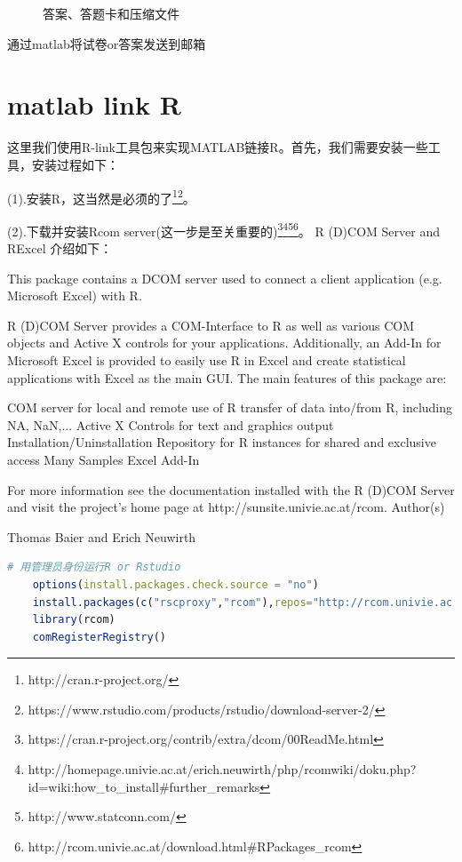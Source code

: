\begin{figure}
\begin{subfigure}[b]{0.5\textwidth}
                    \caption{}
                    \label{fig:压缩文件}
                \end{subfigure}
                 \caption{答案、答题卡和压缩文件}
            \end{figure}
            \par
            通过matlab将试卷or答案发送到邮箱
\section{matlab link R}
    \par
    这里我们使用R-link工具包来实现MATLAB链接R。首先，我们需要安装一些工具，安装过程如下：
    \par
    (1).安装R，这当然是必须的了\footnote{http://cran.r-project.org/}\footnote{https://www.rstudio.com/products/rstudio/download-server-2/}。
    \par
    (2).下载并安装Rcom server(这一步是至关重要的)\footnote{https://cran.r-project.org/contrib/extra/dcom/00ReadMe.html}\footnote{http://homepage.univie.ac.at/erich.neuwirth/php/rcomwiki/doku.php?id=wiki:how\_to\_install\#further\_remarks}\footnote{http://www.statconn.com/}\footnote{http://rcom.univie.ac.at/download.html\#RPackages\_rcom}。
    R (D)COM Server and RExcel 介绍如下：
    \par
    This package contains a DCOM server used to connect a client application (e.g. Microsoft Excel) with R.
    \par
    R (D)COM Server provides a COM-Interface to R as well as various COM objects and Active X controls for your applications. Additionally, an Add-In for Microsoft Excel is provided to easily use R in Excel and create statistical applications with Excel as the main GUI. The main features of this package are:
    \par
        COM server for local and remote use of R
        transfer of data into/from R, including NA, NaN,...
        Active X Controls for text and graphics output
        Installation/Uninstallation
        Repository for R instances for shared and exclusive access
        Many Samples
        Excel Add-In
    \par
    For more information see the documentation installed with the R (D)COM Server and visit the project's home page at http://sunsite.univie.ac.at/rcom.
    Author(s)
    \par
    Thomas Baier and Erich Neuwirth
    \begin{lstlisting}[language = R]
    # 用管理员身份运行R or Rstudio
    options(install.packages.check.source = "no")
    install.packages(c("rscproxy","rcom"),repos="http://rcom.univie.ac.at/download",lib=.Library,type="win.binary")
    library(rcom)
    comRegisterRegistry()
    \end{lstlisting}
